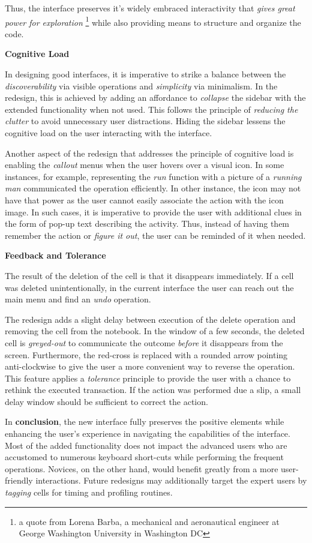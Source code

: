 \documentclass[12pt,letterpaper]{article}
\begin{document}
Thus, the interface preserves it's widely embraced interactivity that \textit{gives great power for exploration} \footnote{a quote from Lorena Barba, a  mechanical and aeronautical engineer at George Washington University in Washington DC} while also providing means to structure and organize the code.


\textbf{Cognitive Load}

In designing good interfaces, it is imperative to strike a balance between the \textit{discoverability} via visible operations and \textit{simplicity} via minimalism. In the redesign, this is achieved by adding an affordance to \textit{collapse} the sidebar with the extended functionality when not used. This follows the principle of \textit{reducing the clutter} to avoid unnecessary user distractions. Hiding the sidebar lessens the cognitive load on the user interacting with the interface. 

Another aspect of the redesign that addresses the principle of cognitive load is enabling the \textit{callout} menus when the user hovers over a visual icon. In some instances, for example, representing the \textit{run} function with a picture of a \textit{running man} communicated the operation efficiently. In other instance, the icon may not have that power as the user cannot easily associate the action with the icon image. In such cases, it is imperative to provide the user with additional clues in the form of pop-up text describing the activity. Thus, instead of having them remember the action or \textit{figure it out}, the user can be reminded of it when needed.  

\textbf{Feedback and Tolerance}

The result of the deletion of the cell is that it disappears immediately. If a cell was deleted unintentionally, in the current interface the user can reach out the main menu and find an \textit{undo} operation. 

The redesign adds a slight delay between execution of the delete operation and removing the cell from the notebook. In the window of a few seconds, the deleted cell is \textit{greyed-out} to communicate the outcome \textit{before} it disappears from the screen. Furthermore, the red-cross is replaced with a rounded arrow pointing anti-clockwise to give the user a more convenient way to reverse the operation. This feature applies a \textit{tolerance} principle to provide the user with a chance to rethink the executed transaction. If the action was performed due a slip, a small delay window should be sufficient to correct the action.

\bigbreak
In \textbf{conclusion}, the new interface fully preserves the positive elements while enhancing the user's experience in navigating the capabilities of the interface. Most of the added functionality does not impact the advanced users who are accustomed to numerous keyboard short-cuts while performing the frequent operations. Novices, on the other hand, would benefit greatly from a more user-friendly interactions. Future redesigns may additionally target the expert users by \textit{tagging} cells for timing and profiling routines.

 

\end{document}

